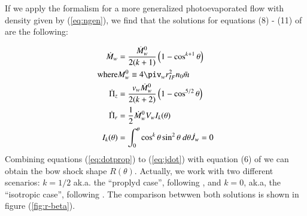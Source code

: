 If we apply the \CRW{} formalism for a more generalized photoevaporated flow with density given by (\ref{eq:ngen}), we find that the solutions for equations (8) - (11) of \CRW{} are the following:

\begin{align}
\dot{M}_w &= \frac{\dot{M}_w^0}{2(k+1)}\left(1-\cos^{k+1}\theta\right) \label{eq:dotprop} \\
\mathrm{where} & M^0_w \equiv 4\piv_w r^2_{IF} n_0 \bar{m}\\
\dot{\Pi}_z &= \frac{v_w\dot{M}_w^0}{2(k+2)}\left(1-\cos^{5/2}\theta\right)  \label{eq:pir}\\
\dot{\Pi}_r &= \frac{1}{2}\dot{M}^0_w V_w I_k (\theta) \label{eq:piz}\\
I_k(\theta) & = \int^\theta_0 \cos^k \theta \sin^2\theta~d\theta
\dot{J}_w = 0 \label{eq:jdot}
\end{align}  
Combining equations  (\ref{eq:dotprop}) to (\ref{eq:jdot}) with equation (6) of \CRW{}  we can obtain the bow shock shape $R(\theta)$. Actually, we work with two different scenarios:
$k=1/2$ ak.a. the ``proplyd case'', following \citep{HA:1998}, and $k=0$, ak.a, the ``isotropic case'', following \CRW{}. The comparison betwwen both solutions is shown in figure (\ref{fig:r-beta}).






